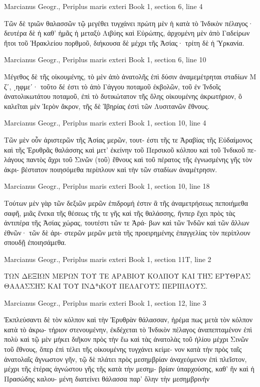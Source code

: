 \documentclass[12pt,letterpaper,twoside,final]{memoir}
\begin{document}
\begin{greek}
Marcianus Geogr., Periplus maris exteri 
Book 1, section 6, line 4

Τῶν δὲ τριῶν θαλασσῶν τῷ μεγέθει τυγχάνει πρώτη 
μὲν ἡ κατὰ τὸ Ἰνδικὸν πέλαγος· δευτέρα δὲ ἡ καθ' ἡμᾶς 
ἡ μεταξὺ Λιβύης καὶ Εὐρώπης, ἀρχομένη μὲν ἀπὸ 
Γαδείρων ἤτοι τοῦ Ἡρακλείου πορθμοῦ, διήκουσα δὲ 
μέχρι τῆς Ἀσίας· τρίτη δὲ ἡ Ὑρκανία. 



Marcianus Geogr., Periplus maris exteri 
Book 1, section 6, line 10

Μέγεθος δὲ τῆς οἰκουμένης, τὸ μὲν ἀπὸ ἀνατολῆς ἐπὶ 
δύσιν ἀναμεμέτρηται σταδίων Μ ζʹ, ͵ηφμεʹ· τοῦτο δέ   
ἐστι τὸ ἀπὸ Γάγγου ποταμοῦ ἐκβολῶν, τοῦ ἐν Ἰνδοῖς 
ἀνατολικωτάτου ποταμοῦ, ἐπὶ τὸ δυτικώτατον τῆς ὅλης 
οἰκουμένης ἀκρωτήριον, ὃ καλεῖται μὲν Ἱερὸν ἄκρον, 
τῆς δὲ Ἰβηρίας ἐστὶ τῶν Λυσιτανῶν ἔθνους. 



Marcianus Geogr., Periplus maris exteri 
Book 1, section 10, line 4

Τῶν μὲν οὖν ἀριστερῶν τῆς Ἀσίας μερῶν, τουτ-
έστι τῆς τε Ἀραβίας τῆς Εὐδαίμονος καὶ τῆς Ἐρυθρᾶς 
θαλάσσης καὶ μετ' ἐκείνην τοῦ Περσικοῦ κόλπου καὶ 
τοῦ Ἰνδικοῦ πελάγους παντὸς ἄχρι τοῦ Σινῶν (τοῦ) 
ἔθνους καὶ τοῦ πέρατος τῆς ἐγνωσμένης γῆς τὸν ἀκρι-
βέστατον ποιησόμεθα περίπλουν καὶ τὴν τῶν σταδίων 
ἀναμέτρησιν. 



Marcianus Geogr., Periplus maris exteri 
Book 1, section 10, line 18

Τούτων μὲν γὰρ τῶν δεξιῶν μερῶν ἐπιδρομή ἐστιν ἃ 
τῆς ἀναμετρήσεως πεποιήμεθα σαφῆ, μιᾶς ἕνεκα τῆς 
θέσεως τῆς τε γῆς καὶ τῆς θαλάσσης, ἥνπερ ἔχει πρὸς 
τὰς ἀντιπέρα τῆς Ἀσίας χώρας, τουτέστι τῶν τε Ἀρά-
βων καὶ τῶν Ἰνδῶν καὶ τῶν ἄλλων ἐθνῶν· τῶν δὲ ἀρι-
στερῶν μερῶν μετὰ τῆς προειρημένης ἐπαγγελίας τὸν 
περίπλουν σπουδῇ ἐποιησάμεθα. 



Marcianus Geogr., Periplus maris exteri 
Book 1, section 11T, line 2

ΤΩΝ ΔΕΞΙΩΝ ΜΕΡΩΝ ΤΟΥ ΤΕ ΑΡΑΒΙΟΥ ΚΟΛΠΟΥ 
 ΚΑΙ ΤΗΣ ΕΡΥΘΡΑΣ ΘΑΛΑΣΣΗΣ ΚΑΙ ΤΟΥ ΙΝΔ*ιΚΟΥ 
 ΠΕΛΑΓΟΥΣ ΠΕΡΙΠΛΟΥΣ. 




Marcianus Geogr., Periplus maris exteri 
Book 1, section 12, line 3

Ἐκπλεύσαντι δὲ τὸν κόλπον καὶ τὴν Ἐρυθρὰν 
θάλασσαν, ἠρέμα πως μετὰ τὸν κόλπον κατὰ τὸ ἀκρω-
τήριον στενουμένην, ἐκδέχεται τὸ Ἰνδικὸν πέλαγος 
ἀναπεπταμένον ἐπὶ πολὺ καὶ τῷ μὲν μήκει διῆκον πρὸς 
τὴν ἕω καὶ τὰς ἀνατολὰς τοῦ ἡλίου μέχρι Σινῶν τοῦ 
ἔθνους, ὅπερ ἐπὶ τέλει τῆς οἰκουμένης τυγχάνει κείμε-
νον κατὰ τὴν πρὸς ταῖς ἀνατολαῖς ἄγνωστον γῆν, τῷ 
δὲ πλάτει πρὸς μεσημβρίαν ἀναχεόμενον ἐπὶ πλεῖστον, 
μέχρι τῆς ἑτέρας ἀγνώστου γῆς τῆς κατὰ τὴν μεσημ-
βρίαν ὑπαρχούσης, καθ' ἣν καὶ ἡ Πρασώδης καλου-
μένη διατείνει θάλασσα παρ' ὅλην τὴν μεσημβρινὴν 





\end{greek}
\end{document}

